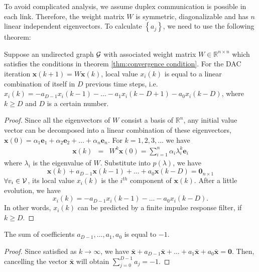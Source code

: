 To avoid complicated analysis, we assume duplex communication is possible
in each link. Therefore, the  weight matrix $W$ is symmetric, diagonalizable
and has $n$ linear independent eigenvectors.  To calculate $\left\{ a_{j}\right\} $,
we need to use the following theorem:
\begin{thm}
\label{thm:LV predictor a_i-1} Suppose an undirected graph ${\cal G}$
with associated weight matrix $W\in\mathbb{R}^{n\times n}$ which
satisfies the conditions in theorem \ref{thm:convergence condition}.
For the DAC iteration $\mathbf{x}(k+1)=W\mathbf{x}(k)$, local value
\textup{$x_{i}\left(k\right)$}  is equal to a linear combination
of  itself in $D$ previous time steps, i.e. $x_{i}\left(k\right)=-a_{D-1}x_{i}\left(k-1\right)-\ldots-a_{1}x_{i}\left(k-D+1\right)-a_{0}x_{i}\left(k-D\right)$,
where $k\geq D$ and $D$ is a certain number.\end{thm}
\begin{proof}
Since all the eigenvectors of $W$ consist a basis of $\mathbb{R}^{n}$,
any initial value vector can be decomposed into a linear combination
of these eigenvectors, $\mathbf{x}\left(0\right)=\alpha_{1}\mathbf{e}_{1}+\alpha_{2}\mathbf{e}_{2}+\ldots+\alpha_{n}\mathbf{e}_{n}$.
For $k=1,2,3,...$ we have
\begin{eqnarray}
\mathbf{x}\left(k\right) & = & W^{k}\mathbf{x}\left(0\right)=\sum_{i=1}^{n}\alpha_{i}\lambda_{i}^{k}\mathbf{e}_{i}\label{eq:x(k) decomposition-1}
\end{eqnarray}
where $\lambda_{i}$ is the eigenvalue of $W$.  Substitute   
into $p\left(\lambda\right)$, we have
\begin{equation}
\mathbf{x}\left(k\right)+a_{D-1}\mathbf{x}\left(k-1\right)+\ldots+a_{0}\mathbf{x}\left(k-D\right)=\mathbf{0}_{n\times1}\label{eq:x(k+D) vector predictor}
\end{equation}
 $\forall v_{i}\in{\cal V}$, its local value $x_{i}\left(k\right)$
is the $i^{th}$ component of $\mathbf{x}\left(k\right)$. After a
little evolution, we have
\begin{equation}
x_{i}\left(k\right)=-a_{D-1}x_{i}\left(k-1\right)-\ldots-a_{0}x_{i}\left(k-D\right).\label{eq:x(k+D) predictor}
\end{equation}
In other words, $x_{i}\left(k\right)$ can be predicted by a finite
impulse response filter, if $k\geq D$. \end{proof}
\begin{lem}
The sum of coefficients \textup{$a_{D-1},\ldots,a_{1},a_{0}$} is
equal to $-1$\textup{. }\end{lem}
\begin{proof}
 Since   satisfied as $k\to\infty$,
we have $\bar{\mathbf{x}}+a_{D-1}\bar{\mathbf{x}}+\ldots+a_{1}\bar{\mathbf{x}}+a_{0}\bar{\mathbf{x}}=\mathbf{0}$.
Then, cancelling the vector $\bar{\mathbf{x}}$ will obtain $\sum_{j=0}^{D-1}a_{j}=-1$. 
\end{proof}

